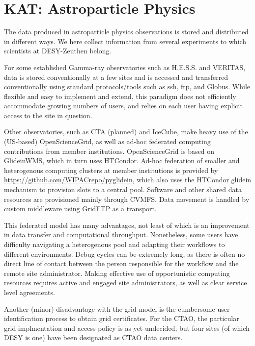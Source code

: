 \section{KAT: Astroparticle Physics} 



The data produced in astroparticle physics observations is stored and 
distributed in different ways. We here collect information from several 
experiments to which scientists at DESY-Zeuthen belong. 

For some established Gamma-ray observatories such as H.E.S.S. and
VERITAS, data is stored conventionally at a few sites and is accessed
and transferred conventionally using standard protocols/tools such as
ssh, ftp, and Globus. While flexible and easy to implement and extend,
this paradigm does not efficiently accommodate growing numbers of users,
and relies on each user having explicit access to the site in question. 

Other observatories, such as CTA (planned) and IceCube, make heavy use
of the (US-based) OpenScienceGrid, as well as ad-hoc federated computing
contributions from member institutions. OpenScienceGrid is based on
GlideinWMS, which in turn uses HTCondor. Ad-hoc federation of smaller
and heterogenous computing clusters at member institutions is provided
by \url{https://github.com/WIPACrepo/pyglidein}, which also uses the
HTCondor glidein mechanism to provision slots to a central pool.
Software and other shared data resources are provisioned mainly through
CVMFS. Data movement is handled by custom middleware using GridFTP as a
transport.

This federated model has many advantages, not least of which is an
improvement in data transfer and computational throughput. Nonetheless,
some users have difficulty navigating a heterogenous pool and adapting
their workflows to different environments. Debug cycles can be extremely
long, as there is often no direct line of contact between the person
responsible for the workflow and the remote site administrator. Making
effective use of opportunistic computing resources requires active and
engaged site administrators, as well as clear service level agreements.

Another (minor) disadvantage with the grid model is the cumbersome user
identification process to obtain grid certificates. For the CTAO, the
particular grid implmentation and access policy is as yet undecided, but
four sites (of which DESY is one) have been designated as CTAO data
centers. 
